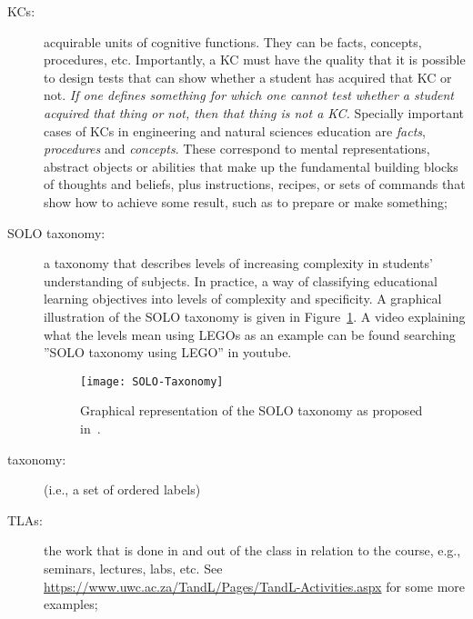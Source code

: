 \begin{description}
	\item[\acfp{KC}:] acquirable units of cognitive functions. They can be facts, concepts, procedures, etc. Importantly, a \ac{KC} must have the quality that it is possible to design tests that can show whether a student has acquired that \ac{KC} or not. \emph{If one defines something for which one cannot test whether a student acquired that thing or not, then that thing is not a \ac{KC}.} Specially important cases of \acp{KC} in engineering and natural sciences education are \emph{facts}, \emph{procedures} and \emph{concepts}. These correspond to mental representations, abstract objects or abilities that make up the fundamental building blocks of thoughts and beliefs, plus instructions, recipes, or sets of commands that show how to achieve some result, such as to prepare or make something;

	\item[\ac{SOLO} taxonomy:] a taxonomy that describes levels of increasing complexity in students' understanding of subjects. In practice, a way of classifying educational learning objectives into levels of complexity and specificity. A graphical illustration of the SOLO taxonomy is given in Figure~\ref{fig:SOLO-taxonomy}. A video explaining what the levels mean using LEGOs as an example can be found searching ''SOLO taxonomy using LEGO'' in youtube.

		\begin{figure}[!htbp]
			\centering
			\texttt{[image: SOLO-Taxonomy]}
			\caption{Graphical representation of the \ac{SOLO} taxonomy as proposed in~\cite{biggs1982evaluation}.}
			\label{fig:SOLO-taxonomy}
		\end{figure}

	\item[taxonomy:] (i.e., a set of ordered labels) 

	\item[\acfp{TLA}:] the work that is done in and out of the class in relation to the course, e.g., seminars, lectures, labs, etc. See \url{https://www.uwc.ac.za/TandL/Pages/TandL-Activities.aspx} for some more examples; 

\end{description} 


